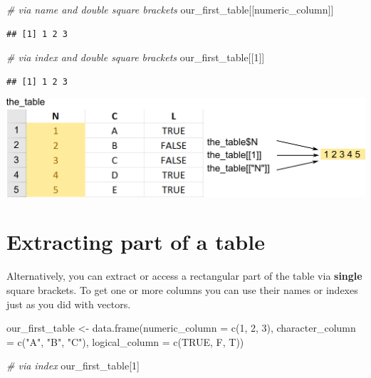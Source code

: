 \documentclass[
]{book}
\newenvironment{Shaded}{\begin{snugshade}}{\end{snugshade}}
\newcommand{\AttributeTok}[1]{\textcolor[rgb]{0.77,0.63,0.00}{#1}}
\newcommand{\CommentTok}[1]{\textcolor[rgb]{0.56,0.35,0.01}{\textit{#1}}}
\newcommand{\ConstantTok}[1]{\textcolor[rgb]{0.00,0.00,0.00}{#1}}
\newcommand{\DecValTok}[1]{\textcolor[rgb]{0.00,0.00,0.81}{#1}}
\newcommand{\FunctionTok}[1]{\textcolor[rgb]{0.00,0.00,0.00}{#1}}
\newcommand{\NormalTok}[1]{#1}
\newcommand{\OtherTok}[1]{\textcolor[rgb]{0.56,0.35,0.01}{#1}}
\newcommand{\StringTok}[1]{\textcolor[rgb]{0.31,0.60,0.02}{#1}}
\begin{document}
\begin{Shaded}
\begin{Highlighting}[]
\CommentTok{\# via name and double square brackets}
\NormalTok{our\_first\_table[[}\StringTok{\textquotesingle{}numeric\_column\textquotesingle{}}\NormalTok{]]}
\end{Highlighting}
\end{Shaded}

\begin{verbatim}
## [1] 1 2 3
\end{verbatim}

\begin{Shaded}
\begin{Highlighting}[]
\CommentTok{\# via index and double square brackets}
\NormalTok{our\_first\_table[[}\DecValTok{1}\NormalTok{]]}
\end{Highlighting}
\end{Shaded}

\begin{verbatim}
## [1] 1 2 3
\end{verbatim}

\begin{center}\includegraphics[width=1\linewidth]{images/table-column} \end{center}

\hypertarget{table-indexing}{%
\section{Extracting part of a table}\label{table-indexing}}

Alternatively, you can extract or access a rectangular part of the table via \textbf{single} square brackets. To get one or more columns you can use their names or indexes just as you did with vectors.

\begin{Shaded}
\begin{Highlighting}[]
\NormalTok{our\_first\_table }\OtherTok{\textless{}{-}} \FunctionTok{data.frame}\NormalTok{(}\AttributeTok{numeric\_column =} \FunctionTok{c}\NormalTok{(}\DecValTok{1}\NormalTok{, }\DecValTok{2}\NormalTok{, }\DecValTok{3}\NormalTok{), }
                              \AttributeTok{character\_column =} \FunctionTok{c}\NormalTok{(}\StringTok{"A"}\NormalTok{, }\StringTok{"B"}\NormalTok{, }\StringTok{"C"}\NormalTok{),}
                              \AttributeTok{logical\_column =} \FunctionTok{c}\NormalTok{(}\ConstantTok{TRUE}\NormalTok{, F, T))}

\CommentTok{\# via index}
\NormalTok{our\_first\_table[}\DecValTok{1}\NormalTok{]}
\end{Highlighting}
\end{Shaded}
\end{document}
